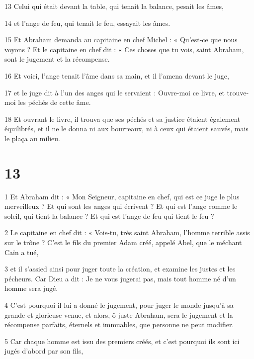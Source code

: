\par 13 Celui qui était devant la table, qui tenait la balance, pesait les âmes,

\par 14 et l'ange de feu, qui tenait le feu, essayait les âmes.

\par 15 Et Abraham demanda au capitaine en chef Michel : « Qu'est-ce que nous voyons ? Et le capitaine en chef dit : « Ces choses que tu vois, saint Abraham, sont le jugement et la récompense.

\par 16 Et voici, l'ange tenait l'âme dans sa main, et il l'amena devant le juge,

\par 17 et le juge dit à l'un des anges qui le servaient : Ouvre-moi ce livre, et trouve-moi les péchés de cette âme.

\par 18 Et ouvrant le livre, il trouva que ses péchés et sa justice étaient également équilibrés, et il ne le donna ni aux bourreaux, ni à ceux qui étaient sauvés, mais le plaça au milieu.


\chapter{13}

\par 1 Et Abraham dit : « Mon Seigneur, capitaine en chef, qui est ce juge le plus merveilleux ? Et qui sont les anges qui écrivent ? Et qui est l’ange comme le soleil, qui tient la balance ? Et qui est l’ange de feu qui tient le feu ?

\par 2 Le capitaine en chef dit : « Vois-tu, très saint Abraham, l'homme terrible assis sur le trône ? C'est le fils du premier Adam créé, appelé Abel, que le méchant Caïn a tué,

\par 3 et il s'assied ainsi pour juger toute la création, et examine les justes et les pécheurs. Car Dieu a dit : Je ne vous jugerai pas, mais tout homme né d'un homme sera jugé.

\par 4 C'est pourquoi il lui a donné le jugement, pour juger le monde jusqu'à sa grande et glorieuse venue, et alors, ô juste Abraham, sera le jugement et la récompense parfaits, éternels et immuables, que personne ne peut modifier.

\par 5 Car chaque homme est issu des premiers créés, et c'est pourquoi ils sont ici jugés d'abord par son fils,

